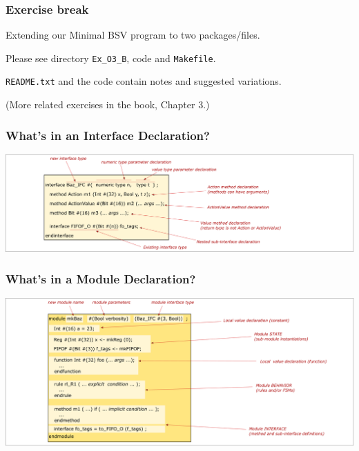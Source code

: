 
\begin{frame}
\frametitle{\EmojiExercise \hmm Exercise break}

Extending our Minimal BSV program to two packages/files.

\vspace{2ex}

Please see directory {\tt Ex\_O3\_B}, code and {\tt Makefile}.

\vspace*{5ex}

{\tt README.txt} and the code contain notes and suggested variations.

\vspace{1ex}

(More related exercises in the book, Chapter 3.)

\end{frame}


\begin{frame}
\frametitle{What's in an Interface Declaration?}

\begin{center}
\includegraphics[width=\textwidth]{../Figures/Fig_BSV_whats_in_an_interface_decl}
\end{center}

\end{frame}


\begin{frame}
\frametitle{What's in a Module Declaration?}

\begin{center}
\includegraphics[width=\textwidth]{../Figures/Fig_BSV_whats_in_a_module_decl}
\end{center}

\end{frame}

